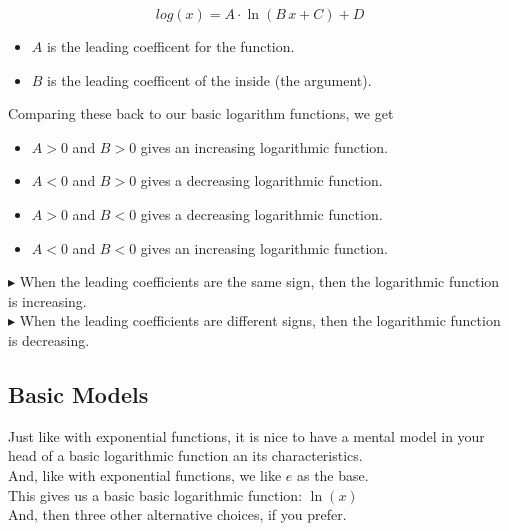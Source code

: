 \documentclass{ximera}
\begin{document}
\[
log(x) = A \cdot \ln(B \, x + C) + D
\]


\begin{itemize}
  \item $A$ is the leading coefficent for the function.
  \item $B$ is the leading coefficent of the inside (the argument).
\end{itemize}


Comparing these back to our basic logarithm functions, we get



\begin{itemize}
  \item $A > 0$ and $B > 0$ gives an increasing logarithmic function.
  \item $A < 0$ and $B > 0$ gives a decreasing logarithmic function.
  \item $A > 0$ and $B < 0$ gives a decreasing logarithmic function.
  \item $A < 0$ and $B < 0$ gives an increasing logarithmic function.
\end{itemize}


$\blacktriangleright$ When the leading coefficients are the same sign, then the logarithmic function is increasing. \\

$\blacktriangleright$ When the leading coefficients are different signs, then the logarithmic function is decreasing. \\






\subsection*{Basic Models}



Just like with exponential functions, it is nice to have a mental model in your head of a basic logarithmic function an its characteristics. \\



And, like with exponential functions, we like $e$ as the base. \\


This gives us a basic basic logarithmic function: $\ln(x)$ \\



And, then three other alternative choices, if you prefer. \\
\end{document}

